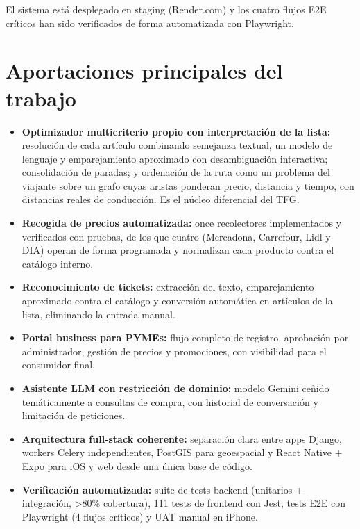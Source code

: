 El sistema est\'a desplegado en staging (Render.com) y los cuatro flujos E2E cr\'iticos han sido
verificados de forma automatizada con Playwright.

\section{Aportaciones principales del trabajo}\label{sec:aportaciones}

\begin{itemize}
  \item \textbf{Optimizador multicriterio propio con interpretaci\'on de la lista:} resoluci\'on de
    cada art\'iculo combinando semejanza textual, un modelo de lenguaje y emparejamiento aproximado
    con desambiguaci\'on interactiva; consolidaci\'on de paradas; y ordenaci\'on de la ruta como un
    problema del viajante sobre un grafo cuyas aristas ponderan precio, distancia y tiempo, con
    distancias reales de conducci\'on. Es el n\'ucleo diferencial del TFG.

  \item \textbf{Recogida de precios automatizada:} once recolectores implementados y verificados con
    pruebas, de los que cuatro (Mercadona, Carrefour, Lidl y DIA) operan de forma programada y
    normalizan cada producto contra el cat\'alogo interno.

  \item \textbf{Reconocimiento de tickets:} extracci\'on del texto, emparejamiento aproximado contra
    el cat\'alogo y conversi\'on autom\'atica en art\'iculos de la lista, eliminando la entrada
    manual.

  \item \textbf{Portal business para PYMEs:} flujo completo de registro, aprobaci\'on por
    administrador, gesti\'on de precios y promociones, con visibilidad para el consumidor final.

  \item \textbf{Asistente LLM con restricci\'on de dominio:} modelo Gemini ce\~nido tem\'aticamente
    a consultas de compra, con historial de conversaci\'on y limitaci\'on de peticiones.

  \item \textbf{Arquitectura full-stack coherente:} separaci\'on clara entre apps Django, workers
    Celery independientes, PostGIS para geoespacial y React Native + Expo para iOS y web desde
    una \'unica base de c\'odigo.

  \item \textbf{Verificaci\'on automatizada:} suite de tests backend (unitarios + integraci\'on,
    \textgreater80\% cobertura), 111 tests de frontend con Jest, tests E2E con Playwright
    (4 flujos cr\'iticos) y UAT manual en iPhone.
\end{itemize}

